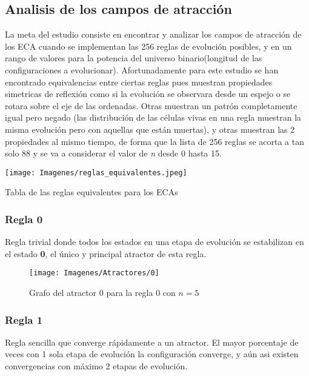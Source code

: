 \documentclass[]{article}
\begin{document}
		\subsection{Analisis de los campos de atracción}
			\justifying
			La meta del estudio consiste en encontrar y analizar los campos de atracción de los ECA cuando se implementan las 256 reglas de evolución posibles, y en un rango de valores para la potencia del universo binario(longitud de las configuraciones a evolucionar). Afortunadamente para este estudio se han encontrado equivalencias entre ciertas reglas pues muestran propiedades simetricas de reflexión como si la evolución se observara desde un espejo o se rotara sobre el eje de las ordenadas. Otras muestran un patrón completamente igual pero negado (las distribución de las células vivas en una regla muestran la misma evolución pero con aquellas que están muertas), y otras muestran las 2 propiedades al mismo tiempo, de forma que la lista de 256 reglas se acorta a tan solo 88 y se va a considerar el valor de \textit{n} desde 0 hasta 15.
			
			\begin{table}[!h]
				\centering
				\texttt{[image: Imagenes/reglas\_equivalentes.jpeg]}
				\label{Reglas_equivalentes}
				\caption{Tabla de las reglas equivalentes para los ECAs}
			\end{table}
			
			\newpage
			\subsubsection{Regla 0}
				\justifying
				Regla trivial donde todos los estados en una etapa de evolución se estabilizan en el estado \textbf{0}, el único y principal atractor de esta regla.
				
				\hfill\break
				\hfill\break
				\hfill\break
				\hfill\break
				\begin{figure}[!h]
					\centering
					\texttt{[image: Imagenes/Atractores/0]}
					\caption{Grafo del atractor 0 para la regla 0 con $n=5$}
					\label{Regla_0}
				\end{figure}
			
			\newpage
			\subsubsection{Regla 1}
				\justifying
				Regla sencilla que converge rápidamente a un atractor. El mayor porcentaje de veces con 1 sola etapa de evolución la configuración converge, y aún asi existen convergencias con máximo 2 etapas de evolución.
				
\end{document}
